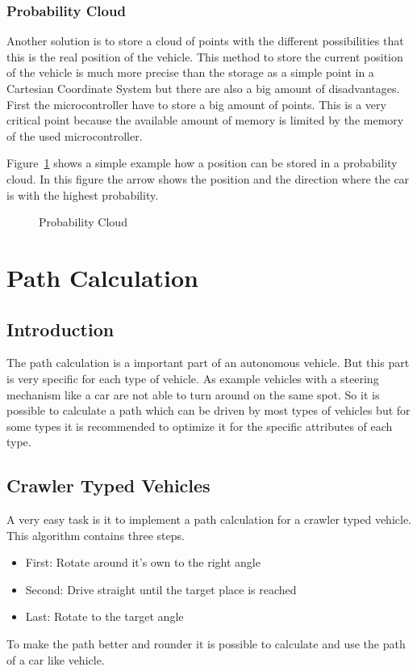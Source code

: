 \subsubsection{Probability Cloud}
Another solution is to store a cloud of points with the different possibilities that this is the real position of the vehicle.
This method to store the current position of the vehicle is much more precise than the storage as a simple point in a Cartesian Coordinate System but there are also a big amount of disadvantages.
First the microcontroller have to store a big amount of points.
This is a very critical point because the available amount of memory is limited by the memory of the used microcontroller.

Figure~\ref{fig:probabilityCloud} shows a simple example how a position can be stored in a probability cloud.
In this figure the arrow shows the position and the direction where the car is with the highest probability.

\begin{figure}

\caption{Probability Cloud}
\label{fig:probabilityCloud}
\end{figure}




\section{Path Calculation}


\subsection{Introduction}
The path calculation is a important part of an autonomous vehicle.
But this part is very specific for each type of vehicle.
As example vehicles with a steering mechanism like a car are not able to turn around on the same spot.
So it is possible to calculate a path which can be driven by most types of vehicles but for some types it is recommended to optimize it for the specific attributes of each type.


\subsection{Crawler Typed Vehicles}
A very easy task is it to implement a path calculation for a crawler typed vehicle.
This algorithm contains three steps.
\begin{itemize}
\item First: Rotate around it's own to the right angle
\item Second: Drive straight until the target place is reached
\item Last: Rotate to the target angle
\end{itemize}
To make the path better and rounder it is possible to calculate and use the path of a car like vehicle.


